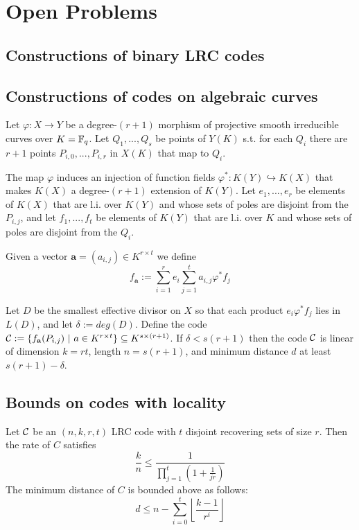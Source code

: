 \chapter{Open Problems}
\cite{MR_LRC}
\section{Constructions of binary LRC codes}
\cite{binary_constructions}

\section{Constructions of codes on algebraic curves}
\cite{LRC_on_alg_curves, LRC_on_alg_curves2, LRC_fibers}

Let $\varphi: X \rightarrow Y$ be a degree-$(r+1)$ morphism of projective smooth irreducible curves over $K={\mathbb F}_q$. Let $Q_1, ..., Q_s$ be points of $Y(K)$ s.t. for each $Q_i$ there are $r+1$ points $P_{i,0},...,P_{i,r}$ in $X(K)$ that map to $Q_i$.

The map $\varphi$ induces an injection of function fields $\varphi^\ast: K(Y) \hookrightarrow K(X)$ that makes $K(X)$ a degree-$(r+1)$ extension of $K(Y)$. Let $e_1,...,e_r$ be elements of $K(X)$ that are l.i. over $K(Y)$ and whose sets of poles are disjoint from the $P_{i,j}$, and let $f_1, ..., f_t$ be elements of $K(Y)$ that are l.i. over $K$ and whose sets of poles are disjoint from the $Q_i$.

Given a vector $\mathbf{a} = (a_{i,j}) \in K^{r \times t}$ we define
$$ f_{\mathbf{a}} := \sum_{i=1}^r e_i \sum_{j=1}^t a_{i,j} \varphi^\ast f_j$$

Let $D$ be the smallest effective divisor on $X$ so that each product $e_i \varphi^\ast f_j$ lies in $L(D)$, and let $\delta := deg(D)$.
Define the code ${\mathcal C} := \{f_{\mathbf{a}}(P_{i,j}) \ \vert \ a \in K^{r \times t}\} \subseteq K^{s \times (r+1)}$.
If $\delta < s(r+1)$ then the code ${\mathcal C}$ is linear of dimension $k=rt$, length $n = s(r+1)$, and minimum distance $d$ at least $s(r+1) - \delta$.

\section{Bounds on codes with locality}
\nocite{combinatorial_bounds}
\nocite{bounds_on_LRC}
\nocite{bounds_on_LRC_t}

\begin{thm}\label{thm:lrc_rate}
Let ${\mathcal C}$ be an $(n,k,r,t)$ LRC code with $t$ disjoint recovering sets of size $r$. Then the rate of $C$ satisfies
\begin{equation}\label{eq:rate_lrc}
\frac{k}{n} \leq \frac{1}{\prod_{j=1}^t(1+\frac{1}{jr})}
\end{equation}
The minimum distance of $C$ is bounded above as follows:
\begin{equation}\label{eq:ass_rate_lrc}
d \leq n - \sum_{i=0}^t \left\lfloor \frac{k-1}{r^i} \right\rfloor
\end{equation}
\end{thm}


